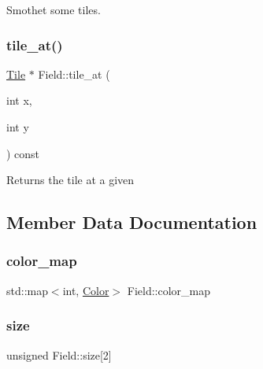 Smothet some tiles. \mbox{\label{classField_aa31d2b14e58becf8741a3b4dc19ecc52}} 
\subsubsection{\texorpdfstring{tile\+\_\+at()}{tile\_at()}}
{\footnotesize\ttfamily \hyperlink{classTile}{Tile} $\ast$ Field\+::tile\+\_\+at (\begin{DoxyParamCaption}\item[{int}]{x,  }\item[{int}]{y }\end{DoxyParamCaption}) const}

\begin{DoxyReturn}{Returns}
the tile at a given 
\end{DoxyReturn}


\subsection{Member Data Documentation}
\mbox{\label{classField_a105993998155a8564b883748b65dddb4}} 
\subsubsection{\texorpdfstring{color\+\_\+map}{color\_map}}
{\footnotesize\ttfamily std\+::map$<$int, \hyperlink{structColor}{Color}$>$ Field\+::color\+\_\+map\hspace{0.3cm}{\ttfamily [private]}}

\mbox{\label{classField_acc2b9f1374f0dbb02f10aaae82762241}} 
\subsubsection{\texorpdfstring{size}{size}}
{\footnotesize\ttfamily unsigned Field\+::size\mbox{[}2\mbox{]}\hspace{0.3cm}{\ttfamily [private]}}

\mbox{\label{classField_afe68ecac3a63285a2514e6b550b2277c}} 
